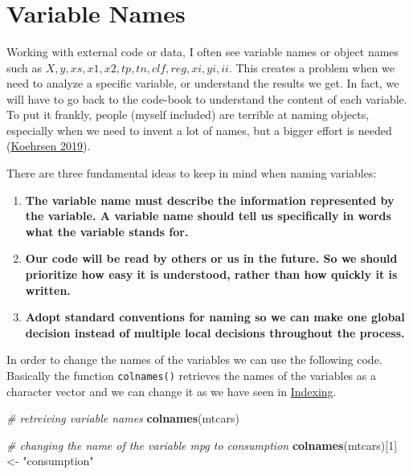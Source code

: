 \documentclass[
]{svmono}
\newenvironment{Shaded}{\begin{snugshade}}{\end{snugshade}}
\newcommand{\CommentTok}[1]{\textcolor[rgb]{0.56,0.35,0.01}{\textit{#1}}}
\newcommand{\DecValTok}[1]{\textcolor[rgb]{0.00,0.00,0.81}{#1}}
\newcommand{\FunctionTok}[1]{\textcolor[rgb]{0.13,0.29,0.53}{\textbf{#1}}}
\newcommand{\NormalTok}[1]{#1}
\newcommand{\OtherTok}[1]{\textcolor[rgb]{0.56,0.35,0.01}{#1}}
\newcommand{\StringTok}[1]{\textcolor[rgb]{0.31,0.60,0.02}{#1}}
\begin{document}
~

~

~

\hypertarget{variable-names}{%
\section{Variable Names}\label{variable-names}}

Working with external code or data, I often see variable names or object
names such as \(X, y, xs, x1, x2, tp, tn, clf, reg, xi, yi, ii\). This
creates a problem when we need to analyze a specific variable, or
understand the results we get. In fact, we will have to go back to the
code-book to understand the content of each variable. To put it frankly,
people (myself included) are terrible at naming objects, especially when
we need to invent a lot of names, but a bigger effort is needed
(\protect\hyperlink{ref-koehrsen2019}{Koehrsen 2019}).

There are three fundamental ideas to keep in mind when naming variables:

\begin{enumerate}
\def\labelenumi{\arabic{enumi}.}
\item
  \textbf{The variable name must describe the information represented by the
  variable. A variable name should tell us specifically in words what
  the variable stands for.}
\item
  \textbf{Our code will be read by others or us in the future. So we should
  prioritize how easy it is understood, rather than how quickly it is
  written.}
\item
  \textbf{Adopt standard conventions for naming so we can make one global
  decision instead of multiple local decisions throughout the
  process.}
\end{enumerate}

In order to change the names of the variables we can use the following
code. Basically the function \texttt{colnames()} retrieves the names of the
variables as a character vector and we can change it as we have seen in
\protect\hyperlink{indexing}{Indexing}.

\begin{Shaded}
\begin{Highlighting}[]
\CommentTok{\# retreiving variable names}
\FunctionTok{colnames}\NormalTok{(mtcars)}

\CommentTok{\# changing the name of the variable mpg to consumption}
\FunctionTok{colnames}\NormalTok{(mtcars)[}\DecValTok{1}\NormalTok{] }\OtherTok{\textless{}{-}} \StringTok{"consumption"}
\end{Highlighting}
\end{Shaded}
\end{document}
